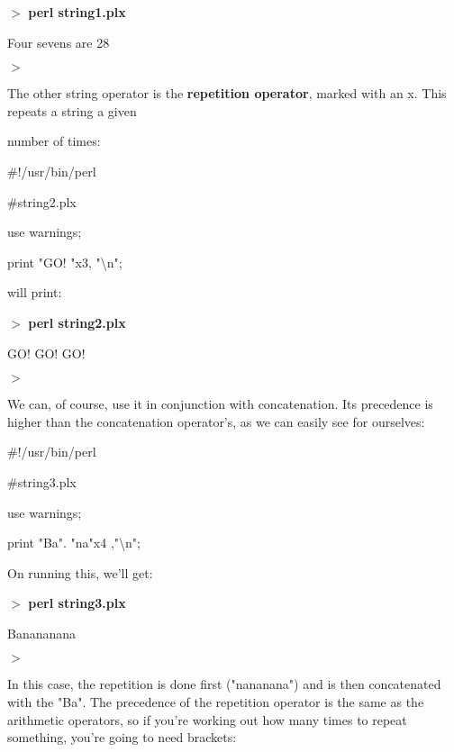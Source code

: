 \documentclass[a4paper,11pt]{book}
\begin{document}
\noindent 

\noindent $>$  \textbf{perl string1.plx}

\noindent Four sevens are 28

\noindent $>$

\noindent 

\noindent 

\noindent The other string operator is the \textbf{repetition operator}, marked with an x. This repeats a string a given

\noindent number of times:

\noindent 

\noindent \#!/usr/bin/perl

\noindent \#string2.plx

\noindent use warnings;

\noindent print "GO! "x3, "\textbackslash n";

\noindent 

\noindent will print:

\noindent 

\noindent $>$ \textbf{perl string2.plx}

\noindent GO! GO! GO!

\noindent $>$

\noindent 

\noindent We can, of course, use it in conjunction with concatenation. Its precedence is higher than the concatenation operator's, as we can easily see for ourselves:

\noindent 

\noindent \#!/usr/bin/perl

\noindent \#string3.plx

\noindent use warnings;

\noindent print "Ba". "na"x4 ,"\textbackslash n";

\noindent 

\noindent On running this, we'll get:

\noindent 

\noindent $>$ \textbf{perl string3.plx}

\noindent Banananana

\noindent $>$

\noindent 

\noindent In this case, the repetition is done first ("nananana") and is then concatenated with the "Ba". The precedence of the repetition operator is the same as the arithmetic operators, so if you're working out how many times to repeat something, you're going to need brackets:
\end{document}
